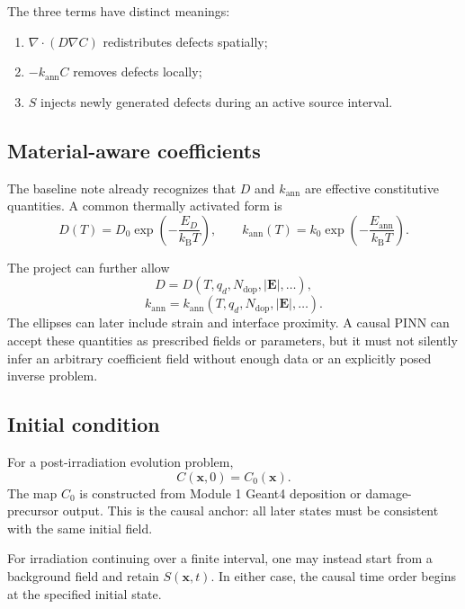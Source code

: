\documentclass[11pt]{article}
\newcommand{\xv}{\bm{x}}
\begin{document}
The three terms have distinct meanings:
\begin{enumerate}[label=\arabic*.]
    \item $\nabla\cdot(D\nabla C)$ redistributes defects spatially;
    \item $-k_{\mathrm{ann}}C$ removes defects locally;
    \item $S$ injects newly generated defects during an active source interval.
\end{enumerate}

\subsection{Material-aware coefficients}

The baseline note already recognizes that $D$ and $k_{\mathrm{ann}}$ are effective constitutive quantities. A common thermally activated form is
\begin{equation}
D(T)=D_0\exp\left(-\frac{E_D}{k_{\mathrm B}T}\right),
\qquad
k_{\mathrm{ann}}(T)=k_0\exp\left(-\frac{E_{\mathrm{ann}}}{k_{\mathrm B}T}\right).
\label{eq:arrhenius}
\end{equation}

The project can further allow
\begin{equation}
D=D(T,q_d,N_{\mathrm{dop}},|\mathbf E|,\ldots),
\end{equation}
\begin{equation}
k_{\mathrm{ann}}
=k_{\mathrm{ann}}(T,q_d,N_{\mathrm{dop}},|\mathbf E|,\ldots).
\end{equation}
The ellipses can later include strain and interface proximity. A causal PINN can accept these quantities as prescribed fields or parameters, but it must not silently infer an arbitrary coefficient field without enough data or an explicitly posed inverse problem.

\subsection{Initial condition}

For a post-irradiation evolution problem,
\begin{equation}
C(\xv,0)=C_0(\xv).
\label{eq:initial_condition}
\end{equation}
The map $C_0$ is constructed from Module 1 Geant4 deposition or damage-precursor output. This is the causal anchor: all later states must be consistent with the same initial field.

For irradiation continuing over a finite interval, one may instead start from a background field and retain $S(\xv,t)$. In either case, the causal time order begins at the specified initial state.
\end{document}
